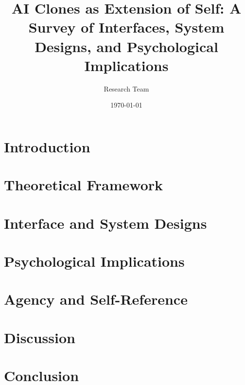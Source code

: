 \documentclass[12pt,a4paper]{article}
\title{AI Clones as Extension of Self: A Survey of Interfaces, System Designs, and Psychological Implications}
\author{Research Team}
\date{\today}
\begin{document}
\begin{CJK}{UTF8}{min}

\maketitle
\tableofcontents
\newpage

\section{Introduction}


\section{Theoretical Framework}


\section{Interface and System Designs}


\section{Psychological Implications}


\section{Agency and Self-Reference}


\section{Discussion}


\section{Conclusion}





\end{CJK}
\end{document}
